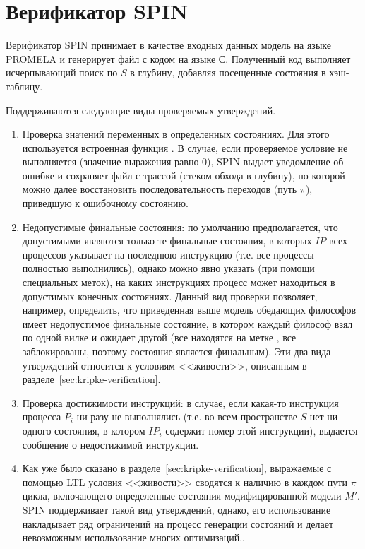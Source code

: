 \section{Верификатор SPIN}
\label{sec:spin}

Верификатор SPIN принимает в качестве входных данных модель на языке PROMELA и генерирует
файл с кодом на языке С. Полученный код выполняет исчерпывающий поиск по $S$ в глубину,
добавляя посещенные состояния в хэш-таблицу.

Поддерживаются следующие виды проверяемых утверждений. 

\begin{enumerate}
\item Проверка значений переменных в определенных состояниях. Для этого используется
  встроенная функция . В случае, если проверяемое условие не выполняется
  (значение выражения равно 0), SPIN выдает уведомление об ошибке и сохраняет файл с
  трассой (стеком обхода в глубину), по которой можно далее восстановить
  последовательность переходов (путь $\pi$), приведшую к ошибочному состоянию.

\item Недопустимые финальные состояния: по умолчанию предполагается, что допустимыми
  являются только те финальные состояния, в которых $IP$ всех процессов указывает на
  последнюю инструкцию (т.е. все процессы полностью выполнились), однако можно явно
  указать (при помощи специальных меток), на каких инструкциях процесс может находиться в
  допустимых конечных состояниях. Данный вид проверки позволяет, например, определить, что
  приведенная выше модель обедающих философов имеет недопустимое финальные состояние, в
  котором каждый философ взял по одной вилке и ожидает другой (все находятся на метке
  , все заблокированы, поэтому состояние является финальным). Эти два вида
  утверждений относится к условиям <<живости>>, описанным в
  разделе~\ref{sec:kripke-verification}.

\item Проверка достижимости инструкций: в случае, если какая-то инструкция процесса $P_i$
  ни разу не выполнялись (т.е. во всем пространстве $S$ нет ни одного состояния, в котором
  $IP_i$ содержит номер этой инструкции), выдается сообщение о недостижимой инструкции.

\item Как уже было сказано в разделе~\ref{sec:kripke-verification}, выражаемые с помощью
  LTL условия <<живости>> сводятся к наличию в каждом пути $\pi$ цикла, включающего
  определенные состояния модифицированной модели $M'$. SPIN поддерживает такой вид
  утверждений, однако, его использование накладывает ряд ограничений на процесс генерации
  состояний и делает невозможным использование многих оптимизаций.\cite{SpinRoot}.
\end{enumerate}

